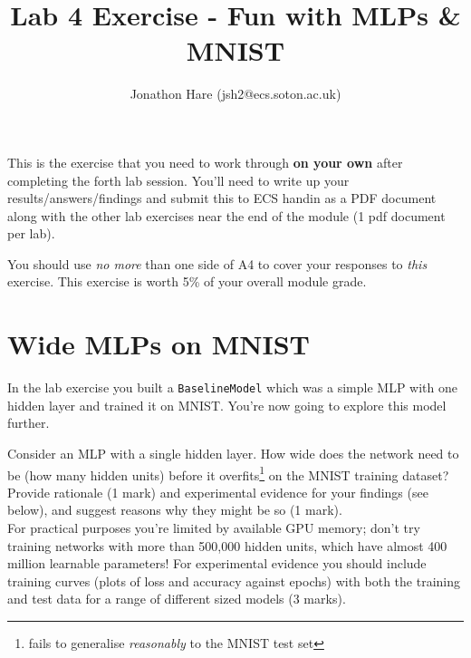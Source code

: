 \documentclass[a4paper]{article}
\begin{document}
\lstset{language=Python,upquote=true}

\setlength{\leftskip}{20pt}
\title{Lab 4 Exercise - Fun with MLPs \& MNIST}
\author{Jonathon Hare (jsh2@ecs.soton.ac.uk)}

\maketitle


This is the exercise that you need to work through \textbf{on your own} after completing the forth lab session. You'll need to write up your results/answers/findings and submit this to ECS handin as a PDF document along with the other lab exercises near the end of the module (1 pdf document per lab). 

You should use \emph{no more} than one side of A4 to cover your responses to \emph{this} exercise. This exercise is worth 5\% of your overall module grade.

\section{Wide MLPs on MNIST}\label{wide}

In the lab exercise you built a \texttt{BaselineModel} which was a simple MLP with one hidden layer and trained it on MNIST. You're now going to explore this model further.

\begin{tcolorbox}[title=1.1 Wider MLPs (5 marks)]
Consider an MLP with a single hidden layer. How wide does the network need to be (how many hidden units) before it overfits\footnote{fails to generalise \emph{reasonably} to the MNIST test set} on the MNIST training dataset? Provide rationale (1 mark) and experimental evidence for your findings (see below), and suggest reasons why they might be so (1 mark).
\\[1em]
For practical purposes you're limited by available GPU memory; don't try training networks with more than 500,000 hidden units, which have almost 400 million learnable parameters! For experimental evidence you should include training curves (plots of loss and accuracy against epochs) with both the training and test data for a range of different sized models (3 marks).
\end{tcolorbox}
\end{document}
